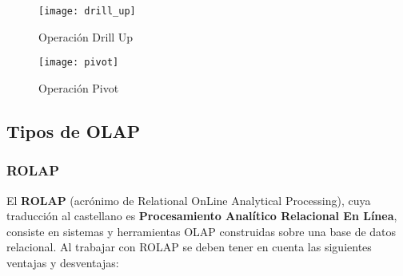 \documentclass[a4paper,11pt]{article}
\begin{document}
    \begin{figure}
      \begin{center}
        \texttt{[image: drill\_up]}
        \caption{Operación Drill Up} \cite{operaciones}
        \label{drill_up}
      \end{center}
    \end{figure}
    
    \begin{figure}
      \begin{center}
        \texttt{[image: pivot]}
        \caption{Operación Pivot} \cite{operaciones}
        \label{pivot}
      \end{center}
    \end{figure}
    
    
    \vspace{0.3in}
    \subsection{Tipos de OLAP}
    
    \subsubsection{ROLAP}
    
    El \textbf{ROLAP} (acrónimo de Relational OnLine Analytical Processing), cuya traducción al castellano es \textbf{Procesamiento Analítico
    Relacional En Línea}, consiste en sistemas y herramientas OLAP construidas sobre una base de datos relacional. Al trabajar con ROLAP se deben
    tener en cuenta las siguientes ventajas y desventajas:
    
\end{document}
